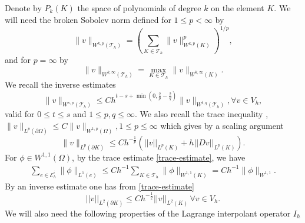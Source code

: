 \documentclass[12pt]{amsart}
\numberwithin{equation}{section}
\newcommand\T{{\mathcal T}}
\begin{document}
Denote by $P_k(K)$ the space of polynomials of degree $k$ on the element $K$. %
We will need the broken Sobolev norm defined for $1 \leq p < \infty$ by
\begin{equation*}
\|v\|_{W^{k,p}(\T_h)}=\left(\sum_{K \in \T_h}\|v\|_{W^{k,p}(K)}^p\right)^{1/p},
\end{equation*}
and for $p=\infty$ by
\begin{equation*}
\|v\|_{W^{k,\infty}(\T_h)}=\max_{K \in \mathcal{T}_h}\|v\|_{W^{k,\infty}(K)}.
\end{equation*}
We recall the inverse estimates \cite[Lemma 4.5.3]{Brenner08}
\begin{equation}\label{inverse}
\|v\|_{W^{s,p}(\mathcal{T}_h)}\leq Ch^{t-s+\min(0,\frac{2}{p}-\frac{2}{q})}\|v\|_{W^{t,q}(\mathcal{T}_h)}, \forall v\in V_h,
\end{equation}
valid for $0\leq t \leq s$ and $1\leq p,q \leq \infty$.  We also recall the trace inequality  \cite[Theorem 1.6.6]{Brenner08},
$\|v\|_{L^p(\partial \Omega)}\leq C \|v\|_{W^{1,p}(\Omega)}, 1 \leq p \leq \infty$ which gives by a scaling argument
\begin{equation}\label{trace-estimate}
\|v\|_{L^p(\partial K)}\leq C h^{-\frac{1}{p}} (||v||_{L^p(K)} + h ||D v||_{L^p(K)} ).
\end{equation}
For $\phi \in W^{1,1}(\Omega)$, by the trace estimate \eqref{trace-estimate}, we have 
\begin{align} \label{w11-phi}
\sum_{e \in \mathcal{E}_h^i} \|\phi\|_{L^1(e)} \leq C h^{-1} \sum_{K \in \mathcal{T}_h}\|\phi\|_{W^{1,1}(K)} 
=C  h^{-1} \|\phi\|_{W^{1,1}}.
\end{align}
By an inverse estimate one has from \eqref{trace-estimate}
\begin{equation}\label{trace-inverse}
||v||_{L^2(\partial K)} \leq C h^{-\frac{1}{2}} ||v||_{L^2(K)} \, \forall v \in V_h.
\end{equation}
We will also need the following properties of the Lagrange interpolant operator $I_h$ \cite[Corollary 4.4.24]{Brenner08}
\end{document}
